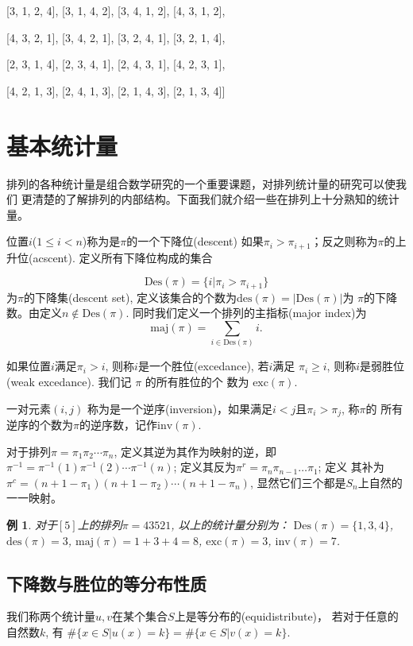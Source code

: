 \documentclass[a4paper,11pt,twoside]{book}
\newtheorem{exa}[thm]{例}
\def \des{\mathrm{des}}
\def \Des{\mathrm{Des}}
\def \maj{\mathrm{maj}}
\def \exc{\mathrm{exc}}
\def \inv{\mathrm{inv}}
\begin{document}
        [3, 1, 2, 4], [3, 1, 4, 2], [3, 4, 1, 2], [4, 3, 1, 2],

        [4, 3, 2, 1], [3, 4, 2, 1], [3, 2, 4, 1], [3, 2, 1, 4],

        [2, 3, 1, 4], [2, 3, 4, 1], [2, 4, 3, 1], [4, 2, 3, 1],

        [4, 2, 1, 3], [2, 4, 1, 3], [2, 1, 4, 3], [2, 1, 3, 4]]

\section{基本统计量}%

排列的各种统计量是组合数学研究的一个重要课题，对排列统计量的研究可以使我们
更清楚的了解排列的内部结构。下面我们就介绍一些在排列上十分熟知的统计量。

位置$i$($1\leqslant i<n$)称为是$\pi$的一个{下降位}(descent)
如果$\pi_i>\pi_{i+1}$；反之则称为$\pi$的{上升位}(acscent).
定义所有下降位构成的集合

$$\Des(\pi)=\{i|\pi_i>\pi_{i+1}\}$$
为$\pi$的下降集(descent set),
定义该集合的个数为$\des(\pi)=|\Des(\pi)|$为
$\pi$的下降数。由定义$n\notin \Des(\pi)$.
同时我们定义一个排列的主指标(major index)为
\[\maj(\pi)=\sum \limits_{i \in \Des(\pi)}i.\]

如果位置$i$满足$\pi_i>i$, 则称$i$是一个{胜位}(excedance), 若$i$满足
$\pi_i\geq i$, 则称$i$是{弱胜位}(weak excedance). 我们记 $\pi$
的所有胜位的个 数为 $\exc(\pi)$.

一对元素$(i,j)$
称为是一个{逆序}(inversion)，如果满足$i<j$且$\pi_i>\pi_j$, 称$\pi$的
所有逆序的个数为$\pi$的逆序数，记作$\inv(\pi)$.

对于排列$\pi=\pi_1\pi_2\cdots \pi_n$, 定义其逆为其作为映射的逆，即
$\pi^{-1}=\pi^{-1}(1)\pi^{-1}(2)\cdots \pi^{-1}(n)$;
定义其反为$\pi^r=\pi_n\pi_{n-1}\ldots\pi_1$; 定义
其补为$\pi^c=(n+1-\pi_1)(n+1-\pi_2)\cdots(n+1-\pi_n)$,
显然它们三个都是$S_n$上自然的一一映射。

\begin{exa}
对于$[5]$上的排列$\pi=43521$, 以上的统计量分别为：
$\Des(\pi)=\{1,3,4\}$, $\des(\pi)=3$, $\maj(\pi)=1+3+4=8$,
$\exc(\pi)=3$, $\inv(\pi)=7$.
\end{exa}

\subsection{下降数与胜位的等分布性质}
我们称两个统计量$u,v$在某个集合$S$上是{等分布的}(equidistribute)，
若对于任意的自然数$k$, 有
$\#\{x\in S|u(x)=k\}=\#\{x\in S|v(x)=k\}$.
\end{document}

